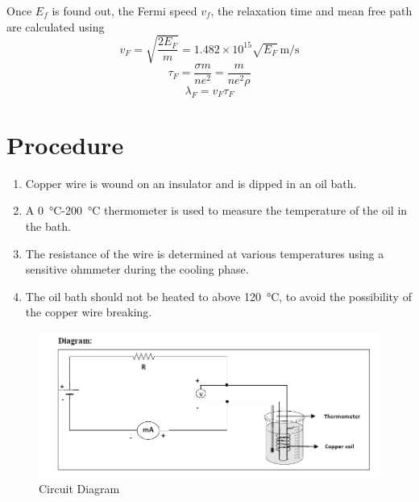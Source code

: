 	Once $E_{f}$ is found out, the Fermi speed $v_{f}$, the relaxation time and mean free path are calculated using
	\begin{equation}\label{eqn:Fermi-velocity-MAIN}
		v_{F}=\sqrt{\frac{2 E_{F}}{m}}=1.482 \times 10^{15} \sqrt{E_{F}} \, \si{\meter\per\second}
	\end{equation}
	\begin{equation}\label{eqn:tau-F-MAIN}
		\tau_{F}=\frac{\sigma m}{ne^{2}}=\frac{m}{ne^{2}\rho}
	\end{equation}
	\begin{equation}\label{eqn:lambda-F-MAIN}
		\lambda_{F}=v_{F}\tau_{F} 
	\end{equation}
	
	\section{Procedure}
	
	\begin{enumerate}
		\item 	Copper wire is wound on an insulator and is dipped in an oil bath.
		\item 	 A \SI{0}{\degreeCelsius}-\SI{200}{\degreeCelsius} thermometer is used to measure the temperature of the oil in the bath.
		\item 	 The resistance of the wire is determined at various temperatures using a sensitive ohmmeter during the cooling phase.
		\item  	The oil bath should not be heated to above \SI{120}{\degreeCelsius}, to avoid the possibility of the copper wire breaking.
	\end{enumerate}
	
	\begin{figure}[H]
		\centering
		\includegraphics[width=\textwidth]{Experiments/Ch-05-diagram.png}
		\caption{Circuit Diagram}
		\label{fig:1205-diagram}	
	\end{figure}
	
